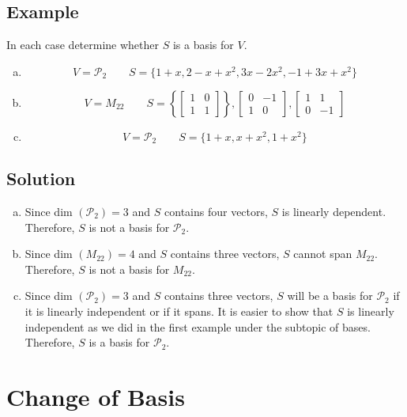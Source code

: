 \subsection*{Example}
In each case determine whether $S$ is a basis for $V$.
\begin{enumerate}[(a)]
    \item \[V=\mathscr{P}_2 \qquad S=\{1+x,2-x+x^2,3x-2x^2,-1+3x+x^2\}\]
    \item \[V=M_{22} \qquad S=\left\{\begin{bmatrix}
                  1 & 0 \\
                  1 & 1
              \end{bmatrix}\right\},\begin{bmatrix}
                  0 & -1 \\
                  1 & 0
              \end{bmatrix},\begin{bmatrix}
                  1 & 1  \\
                  0 & -1
              \end{bmatrix}\]
    \item \[V=\mathscr{P}_2 \qquad S=\{1+x,x+x^2,1+x^2\}\]
\end{enumerate}

\subsection*{Solution}
\begin{enumerate}[(a)]
    \item Since dim $(\mathscr{P}_2) = 3$ and $S$ contains four vectors, $S$ is linearly dependent.
          Therefore, $S$ is not a basis for $\mathscr{P}_2$.
    \item Since dim $(M_{22}) = 4$ and $S$ contains three vectors, $S$ cannot span $M_{22}$.
          Therefore, $S$ is not a basis for $M_{22}$.
    \item Since dim $(\mathscr{P}_2) = 3$ and $S$ contains three vectors, $S$ will
          be a basis for $\mathscr{P}_2$ if it is linearly independent or if it spans.
          It is easier to show that $S$ is linearly independent as we did in the first
          example under the subtopic of bases. Therefore, $S$ is a basis for $\mathscr{P}_2$.
\end{enumerate}

\section{Change of Basis}

